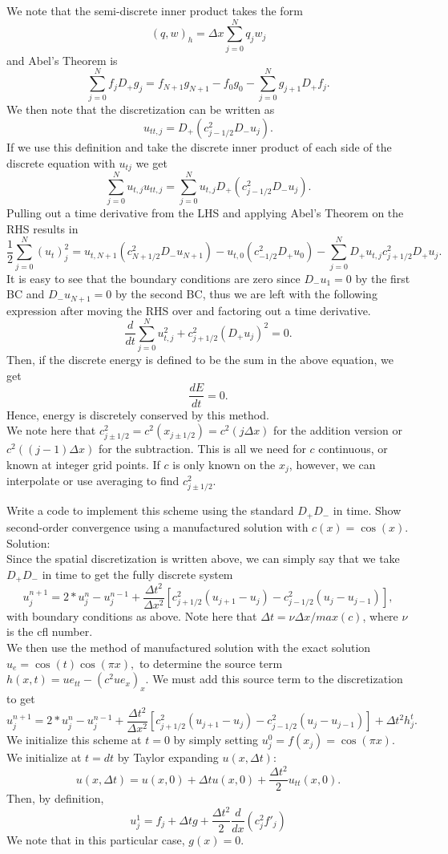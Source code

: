 We note that the semi-discrete inner product takes the form
$$(q,w)_h=\Delta x\sum_{j=0}^{N}q_jw_j$$
and Abel's Theorem is
$$\sum_{j=0}^{N}f_jD_+g_j=f_{N+1}g_{N+1}-f_0g_0-\sum_{j=0}^{N}g_{j+1}D_+f_j.$$
We then note that the discretization can be written as
$$u_{tt,j}=D_+(c_{j-1/2}^2D_-u_j).$$
If we use this definition and take the discrete inner product of each side of the discrete equation with $u_{tj}$ we get
$$\sum_{j=0}^Nu_{t,j}u_{tt,j}=\sum_{j=0}^Nu_{t,j}D_+(c_{j-1/2}^2D_-u_j).$$
Pulling out a time derivative from the LHS and applying Abel's Theorem on the RHS results in
$$\frac{1}{2}\sum_{j=0}^N(u_t)^2_j=u_{t,N+1}(c_{N+1/2}^2D_-u_{N+1})-u_{t,0}(c_{-1/2}^2D_+u_{0})-\sum_{j=0}^ND_+u_{t,j}c_{j+1/2}^2D_+u_j.$$
It is easy to see that the boundary conditions are zero since $D_-u_{1}=0$ by the first BC and $D_-u_{N+1}=0$ by the second BC, thus we are left with the following expression after moving the RHS over and factoring out a time derivative.
$$\frac{d}{dt}\sum_{j=0}^Nu_{t,j}^2+c_{j+1/2}^2(D_+u_j)^2=0.$$
Then, if the discrete energy is defined to be the sum in the above equation, we get
$$\frac{dE}{dt}=0.$$
Hence, energy is discretely conserved by this method.\\
We note here that $c_{j\pm1/2}^2=c^2(x_{j\pm1/2})=c^2(j\Delta x)$ for the addition version or $c^2((j-1)\Delta x)$ for the subtraction. This is all we need for $c$ continuous, or known at integer grid points. If $c$ is only known on the $x_j$, however, we can interpolate or use averaging to find $c_{j\pm1/2}^2.$


\item Write a code to implement this scheme using the standard $D_+D_-$ in time. Show second-order convergence using a manufactured solution with $c(x)=\cos(x)$.\\
Solution:\\

Since the spatial discretization is written above, we can simply say that we take $D_+D_-$ in time to get the fully discrete system
$$u_j^{n+1}=2*u_j^n-u_j^{n-1}+\frac{\Delta t^2}{\Delta x^2}[c_{j+1/2}^2(u_{j+1}-u_j)-c_{j-1/2}^2(u_j-u_{j-1})],$$
with boundary conditions as above. Note here that $\Delta t=\nu \Delta x/max(c)$, where $\nu$ is the cfl number.\\
 We then use the method of manufactured solution with the exact solution $u_e=\cos(t)\cos(\pi x),$ to determine the source term $h(x,t)=ue_{tt}-(c^2 ue_x)_x$. We must add this source term to the discretization to get
$$u_j^{n+1}=2*u_j^n-u_j^{n-1}+\frac{\Delta t^2}{\Delta x^2}[c_{j+1/2}^2(u_{j+1}-u_j)-c_{j-1/2}^2(u_j-u_{j-1})]+\Delta t^2 h_j^t.$$
 We initialize this scheme at $t=0$ by simply setting $u_j^0=f(x_j)=\cos(\pi x).$ We initialize at $t=dt$ by Taylor expanding $u(x,\Delta t)$:
$$u(x,\Delta t)=u(x,0)+\Delta tu(x,0)+\frac{\Delta t^2}{2}u_{tt}(x,0).$$
Then, by definition,
$$u_j^1=f_j+\Delta t g +\frac{\Delta t^2}{2}\frac{d}{dx}(c_j^2 f'_j)$$
We note that in this particular case, $g(x)=0.$ \\

